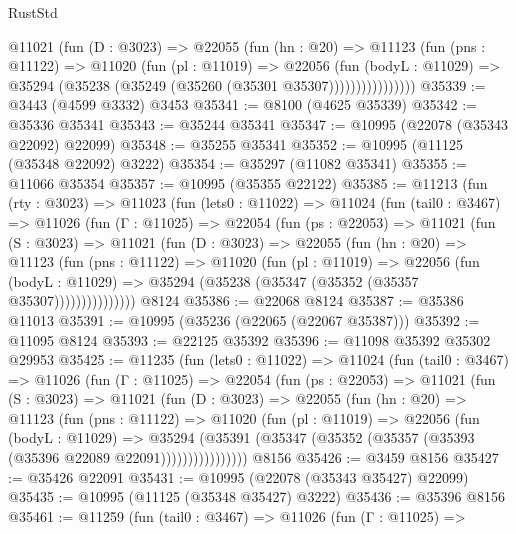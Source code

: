 \begin{lexlean}{RustStd}
\begin{coremodule}
                @11021
                  (fun (D : @3023) =>
                  @22055
                    (fun (hn : @20) =>
                    @11123
                      (fun (pns : @11122) =>
                      @11020
                        (fun (pl : @11019) =>
                        @22056
                          (fun (bodyL : @11029) =>
                          @35294 (@35238 (@35249 (@35260 (@35301 @35307))))))))))))))))
@35339 := @3443 (@4599 @3332) @3453
@35341 := @8100 (@4625 @35339)
@35342 := @35336 @35341
@35343 := @35244 @35341
@35347 := @10995 (@22078 (@35343 @22092) @22099)
@35348 := @35255 @35341
@35352 := @10995 (@11125 (@35348 @22092) @3222)
@35354 := @35297 (@11082 @35341)
@35355 := @11066 @35354
@35357 := @10995 (@35355 @22122)
@35385 := @11213
    (fun (rty : @3023) =>
    @11023
      (fun (lets0 : @11022) =>
      @11024
        (fun (tail0 : @3467) =>
        @11026
          (fun (Γ : @11025) =>
          @22054
            (fun (ps : @22053) =>
            @11021
              (fun (S : @3023) =>
              @11021
                (fun (D : @3023) =>
                @22055
                  (fun (hn : @20) =>
                  @11123
                    (fun (pns : @11122) =>
                    @11020
                      (fun (pl : @11019) =>
                      @22056
                        (fun (bodyL : @11029) =>
                        @35294 (@35238 (@35347 (@35352 (@35357 @35307)))))))))))))))
    @8124
@35386 := @22068 @8124
@35387 := @35386 @11013
@35391 := @10995 (@35236 (@22065 (@22067 @35387)))
@35392 := @11095 @8124
@35393 := @22125 @35392
@35396 := @11098 @35392 @35302 @29953
@35425 := @11235
    (fun (lets0 : @11022) =>
    @11024
      (fun (tail0 : @3467) =>
      @11026
        (fun (Γ : @11025) =>
        @22054
          (fun (ps : @22053) =>
          @11021
            (fun (S : @3023) =>
            @11021
              (fun (D : @3023) =>
              @22055
                (fun (hn : @20) =>
                @11123
                  (fun (pns : @11122) =>
                  @11020
                    (fun (pl : @11019) =>
                    @22056
                      (fun (bodyL : @11029) =>
                      @35294
                        (@35391
                          (@35347 (@35352 (@35357 (@35393 (@35396 @22089 @22091))))))))))))))))
    @8156
@35426 := @3459 @8156
@35427 := @35426 @22091
@35431 := @10995 (@22078 (@35343 @35427) @22099)
@35435 := @10995 (@11125 (@35348 @35427) @3222)
@35436 := @35396 @8156
@35461 := @11259
    (fun (tail0 : @3467) =>
    @11026
      (fun (Γ : @11025) =>

\end{coremodule}
\end{lexlean}
